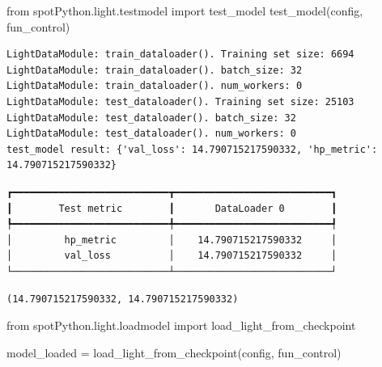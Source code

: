 \documentclass[
  letterpaper,
  DIV=11,
  numbers=noendperiod]{scrreprt}
\newenvironment{Shaded}{\begin{snugshade}}{\end{snugshade}}
\newcommand{\ImportTok}[1]{\textcolor[rgb]{0.00,0.46,0.62}{#1}}
\newcommand{\NormalTok}[1]{\textcolor[rgb]{0.00,0.23,0.31}{#1}}
\newcommand{\OperatorTok}[1]{\textcolor[rgb]{0.37,0.37,0.37}{#1}}
\begin{document}
\begin{Shaded}
\begin{Highlighting}[]
\ImportTok{from}\NormalTok{ spotPython.light.testmodel }\ImportTok{import}\NormalTok{ test\_model}
\NormalTok{test\_model(config, fun\_control)}
\end{Highlighting}
\end{Shaded}

\begin{verbatim}
LightDataModule: train_dataloader(). Training set size: 6694
LightDataModule: train_dataloader(). batch_size: 32
LightDataModule: train_dataloader(). num_workers: 0
LightDataModule: test_dataloader(). Training set size: 25103
LightDataModule: test_dataloader(). batch_size: 32
LightDataModule: test_dataloader(). num_workers: 0
test_model result: {'val_loss': 14.790715217590332, 'hp_metric': 14.790715217590332}
\end{verbatim}

\begin{verbatim}
┏━━━━━━━━━━━━━━━━━━━━━━━━━━━┳━━━━━━━━━━━━━━━━━━━━━━━━━━━┓
┃        Test metric        ┃       DataLoader 0        ┃
┡━━━━━━━━━━━━━━━━━━━━━━━━━━━╇━━━━━━━━━━━━━━━━━━━━━━━━━━━┩
│         hp_metric         │    14.790715217590332     │
│         val_loss          │    14.790715217590332     │
└───────────────────────────┴───────────────────────────┘
\end{verbatim}

\begin{verbatim}
(14.790715217590332, 14.790715217590332)
\end{verbatim}

\begin{Shaded}
\begin{Highlighting}[]
\ImportTok{from}\NormalTok{ spotPython.light.loadmodel }\ImportTok{import}\NormalTok{ load\_light\_from\_checkpoint}

\NormalTok{model\_loaded }\OperatorTok{=}\NormalTok{ load\_light\_from\_checkpoint(config, fun\_control)}
\end{Highlighting}
\end{Shaded}
\end{document}
